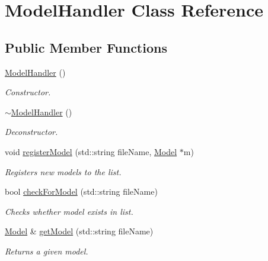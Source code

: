 \hypertarget{class_model_handler}{\section{Model\+Handler Class Reference}
\label{class_model_handler}
}
\subsection*{Public Member Functions}
\begin{DoxyCompactItemize}
\item 
\hypertarget{class_model_handler_a1eb33fd62e57a5115a2755090a533deb}{\hyperlink{class_model_handler_a1eb33fd62e57a5115a2755090a533deb}{Model\+Handler} ()}\label{class_model_handler_a1eb33fd62e57a5115a2755090a533deb}

\begin{DoxyCompactList}\small\item\em Constructor. \end{DoxyCompactList}\item 
\hypertarget{class_model_handler_af8c96e8de32801679ffc30e31d25a3ca}{\hyperlink{class_model_handler_af8c96e8de32801679ffc30e31d25a3ca}{$\sim$\+Model\+Handler} ()}\label{class_model_handler_af8c96e8de32801679ffc30e31d25a3ca}

\begin{DoxyCompactList}\small\item\em Deconstructor. \end{DoxyCompactList}\item 
\hypertarget{class_model_handler_ae2951e55741cc31e6490f5d98d3e84f5}{void \hyperlink{class_model_handler_ae2951e55741cc31e6490f5d98d3e84f5}{register\+Model} (std\+::string file\+Name, \hyperlink{class_model}{Model} $\ast$m)}\label{class_model_handler_ae2951e55741cc31e6490f5d98d3e84f5}

\begin{DoxyCompactList}\small\item\em Registers new models to the list. \end{DoxyCompactList}\item 
\hypertarget{class_model_handler_a935ceff894c06148839d8f6ae1b59272}{bool \hyperlink{class_model_handler_a935ceff894c06148839d8f6ae1b59272}{check\+For\+Model} (std\+::string file\+Name)}\label{class_model_handler_a935ceff894c06148839d8f6ae1b59272}

\begin{DoxyCompactList}\small\item\em Checks whether model exists in list. \end{DoxyCompactList}\item 
\hypertarget{class_model_handler_a2a705ce466c536b85cdaccef1bd12990}{\hyperlink{class_model}{Model} \& \hyperlink{class_model_handler_a2a705ce466c536b85cdaccef1bd12990}{get\+Model} (std\+::string file\+Name)}\label{class_model_handler_a2a705ce466c536b85cdaccef1bd12990}

\begin{DoxyCompactList}\small\item\em Returns a given model. \end{DoxyCompactList}\end{DoxyCompactItemize}



